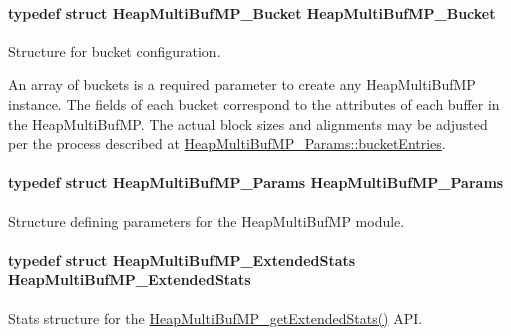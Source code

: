 \paragraph[{Heap\-Multi\-Buf\-M\-P\-\_\-\-Bucket}]{\setlength{\rightskip}{0pt plus 5cm}typedef struct {\bf Heap\-Multi\-Buf\-M\-P\-\_\-\-Bucket}  {\bf Heap\-Multi\-Buf\-M\-P\-\_\-\-Bucket}}\label{_heap_multi_buf_m_p_8h_ae5ebd64bf1712fe348d9fa6ba7d93017}


Structure for bucket configuration. 

An array of buckets is a required parameter to create any Heap\-Multi\-Buf\-M\-P instance. The fields of each bucket correspond to the attributes of each buffer in the Heap\-Multi\-Buf\-M\-P. The actual block sizes and alignments may be adjusted per the process described at \hyperlink{struct_heap_multi_buf_m_p___params_ac130e0ad7fad30d9c759af90984dee8b}{Heap\-Multi\-Buf\-M\-P\-\_\-\-Params\-::bucket\-Entries}. 
\paragraph[{Heap\-Multi\-Buf\-M\-P\-\_\-\-Params}]{\setlength{\rightskip}{0pt plus 5cm}typedef struct {\bf Heap\-Multi\-Buf\-M\-P\-\_\-\-Params}  {\bf Heap\-Multi\-Buf\-M\-P\-\_\-\-Params}}\label{_heap_multi_buf_m_p_8h_a99f17c33d2dc597764d5e3cab6f96762}


Structure defining parameters for the Heap\-Multi\-Buf\-M\-P module. 

\paragraph[{Heap\-Multi\-Buf\-M\-P\-\_\-\-Extended\-Stats}]{\setlength{\rightskip}{0pt plus 5cm}typedef struct {\bf Heap\-Multi\-Buf\-M\-P\-\_\-\-Extended\-Stats}  {\bf Heap\-Multi\-Buf\-M\-P\-\_\-\-Extended\-Stats}}\label{_heap_multi_buf_m_p_8h_a1182cc241dd94d235a2b6d1b74afc2e1}


Stats structure for the \hyperlink{_heap_multi_buf_m_p_8h_a386420101752537b59e12520aafd9b0d}{Heap\-Multi\-Buf\-M\-P\-\_\-get\-Extended\-Stats()} A\-P\-I. 



